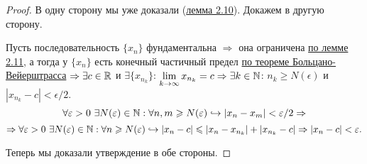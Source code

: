 \begin{proof}
    В одну сторону мы уже доказали (\hyperlink{lemm2.10}{лемма 2.10}). Докажем в другую сторону.

    Пусть последовательность $\{ x_{n} \}$ фундаментальна $\Rightarrow$ она ограничена \hyperlink{lemm2.11}{по лемме 2.11}, а тогда у $\{ x_{n} \}$ есть конечный частичный предел \hyperlink{thm2.8}{по теореме Больцано-Вейерштрасса} $\Rightarrow \exists c \in \mathbb{R}$ и $\exists \{ x_{n_{k}} \}$: $\lim\limits_{k\to \infty} x_{n_{k}} = c \Rightarrow \exists k \in \mathbb{N}$: $n_{k} \geq N (\epsilon)$ и $|x_{n_{k}} - c| < \epsilon / 2$.
    $$ \forall \varepsilon > 0 \  \exists N (\varepsilon) \in \mathbb{N}: \forall n, m \geqslant N (\varepsilon) \hookrightarrow |x_{n} - x_{m}| < \varepsilon / 2 \Rightarrow$$
    $$ \Rightarrow \forall \varepsilon > 0 \  \exists N (\varepsilon) \in \mathbb{N}: \forall n \geqslant N (\varepsilon) \hookrightarrow |x_{n} - c| \leqslant |x_{n} - x_{n_{k}}| + |x_{n_{k}} - c| \Rightarrow |x_{n} - c| < \varepsilon.$$

    Теперь мы доказали утверждение в обе стороны.
\end{proof}